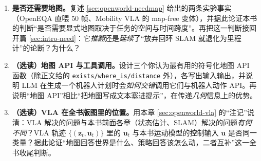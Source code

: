 \begin{enumerate}
  \item \textbf{是否还需要地图。}\;复述 \cref{sec:openworld-needmap} 给出的两条实验事实（OpenEQA 直喂 $50$ 帧、Mobility VLA 的 map-free 变体），并据此论证本书的判断“是否需要显式地图取决于任务的空间与时间跨度”。再把这一判断接回开篇 \cref{sec:intro-need}：它\emph{推翻}还是\emph{延续}了“放弃回环 SLAM 就退化为里程计”的论断？为什么？
  \item \textbf{（选读）地图 API 与工具调用。}\;设计三个你认为最有用的符号化地图 API 函数（除正文给的 \texttt{exists/where\_is/distance} 外），各写出输入输出，并说明 LLM 在生成一个机器人计划时会\emph{如何交错}调用它们与机器人动作 API。再说明“地图 API”相比“把地图写成文本塞进提示”，在传递\emph{几何}信息上的优势。
  \item \textbf{（选读）VLA 在全书版图里的位置。}\;用本章 \cref{sec:openworld-vla} 的“注记”说清：VLA 解决的问题与本书前面各章（状态估计、SLAM）解决的问题\emph{有何不同}？VLA 轨迹 $\{(\mathbf{z}_t,\mathbf{u}_t)\}$ 里的 $\mathbf{u}_t$ 与本书运动模型的控制输入 $\mathbf{u}$ 是否同一类量？据此论证“地图回答世界是什么、策略回答该怎么动，二者互补”这一全书收尾判断。
\end{enumerate}

